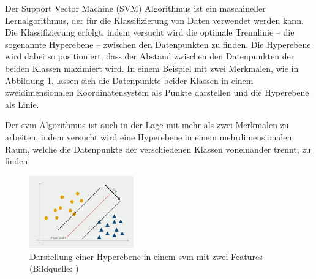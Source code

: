 





Der Support Vector Machine (SVM) Algorithmus ist ein maschineller Lernalgorithmus, der für die Klassifizierung von Daten verwendet werden kann. Die Klassifizierung erfolgt, indem versucht wird die optimale Trennlinie – die sogenannte Hyperebene – zwischen den Datenpunkten zu finden. Die Hyperebene wird dabei so positioniert, dass der Abstand zwischen den Datenpunkten der beiden Klassen maximiert wird. In einem Beispiel mit zwei Merkmalen, wie in Abbildung \ref{fig:svm_hyperplane}, lassen sich die Datenpunkte beider Klassen in einem zweidimensionalen Koordinatensystem als Punkte darstellen und die Hyperebene als Linie. 

Der \gls{svm} Algorithmus ist auch in der Lage mit mehr als zwei Merkmalen zu arbeiten, indem versucht wird eine Hyperebene in einem mehrdimensionalen Raum, welche die Datenpunkte der verschiedenen Klassen voneinander trennt, zu finden.

\begin{figure}[H]
    \centering
    \includegraphics[width=0.4\textwidth]{images/source_svm.png}
    \caption{Darstellung einer Hyperebene in einem \gls{svm} mit zwei Features (Bildquelle: \citeauthor{databasecampSupportVector} \citeyear{databasecampSupportVector})}
    \label{fig:svm_hyperplane}
\end{figure}

